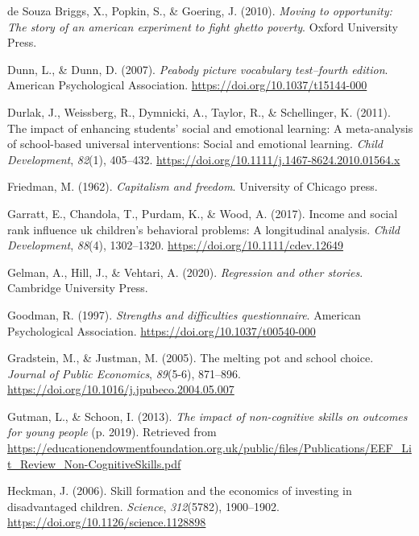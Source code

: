 \documentclass[
  english,
  man]{apa6}
\newlength{\cslhangindent}
\newenvironment{cslreferences}%
  {\setlength{\parindent}{0pt}%
  \everypar{\setlength{\hangindent}{\cslhangindent}}\ignorespaces}%
  {\par}
\begin{document}
\begin{cslreferences}
\leavevmode\hypertarget{ref-desouzabriggs2010}{}%
de Souza Briggs, X., Popkin, S., \& Goering, J. (2010). \emph{Moving to opportunity: The story of an american experiment to fight ghetto poverty}. Oxford University Press.

\leavevmode\hypertarget{ref-dunn2007}{}%
Dunn, L., \& Dunn, D. (2007). \emph{Peabody picture vocabulary test--fourth edition}. American Psychological Association. \url{https://doi.org/10.1037/t15144-000}

\leavevmode\hypertarget{ref-durlak2011}{}%
Durlak, J., Weissberg, R., Dymnicki, A., Taylor, R., \& Schellinger, K. (2011). The impact of enhancing students' social and emotional learning: A meta-analysis of school-based universal interventions: Social and emotional learning. \emph{Child Development}, \emph{82}(1), 405--432. \url{https://doi.org/10.1111/j.1467-8624.2010.01564.x}

\leavevmode\hypertarget{ref-friedman1962}{}%
Friedman, M. (1962). \emph{Capitalism and freedom}. University of Chicago press.

\leavevmode\hypertarget{ref-garratt2017}{}%
Garratt, E., Chandola, T., Purdam, K., \& Wood, A. (2017). Income and social rank influence uk children's behavioral problems: A longitudinal analysis. \emph{Child Development}, \emph{88}(4), 1302--1320. \url{https://doi.org/10.1111/cdev.12649}

\leavevmode\hypertarget{ref-gelman2020regression}{}%
Gelman, A., Hill, J., \& Vehtari, A. (2020). \emph{Regression and other stories}. Cambridge University Press.

\leavevmode\hypertarget{ref-goodman1997}{}%
Goodman, R. (1997). \emph{Strengths and difficulties questionnaire}. American Psychological Association. \url{https://doi.org/10.1037/t00540-000}

\leavevmode\hypertarget{ref-gradstein2005}{}%
Gradstein, M., \& Justman, M. (2005). The melting pot and school choice. \emph{Journal of Public Economics}, \emph{89}(5-6), 871--896. \url{https://doi.org/10.1016/j.jpubeco.2004.05.007}

\leavevmode\hypertarget{ref-gutman2013}{}%
Gutman, L., \& Schoon, I. (2013). \emph{The impact of non-cognitive skills on outcomes for young people} (p. 2019). Retrieved from \url{https://educationendowmentfoundation.org.uk/public/files/Publications/EEF_Lit_Review_Non-CognitiveSkills.pdf}

\leavevmode\hypertarget{ref-heckman2006}{}%
Heckman, J. (2006). Skill formation and the economics of investing in disadvantaged children. \emph{Science}, \emph{312}(5782), 1900--1902. \url{https://doi.org/10.1126/science.1128898}


\end{cslreferences}
\end{document}
